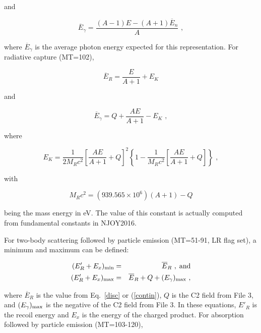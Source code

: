 \noindent
and

\begin{equation}
   \overline{E}_\gamma=
     \frac{(A-1)E-(A+1)\overline{E}_n}{A}\,\,,
\label{contin2}
\end{equation}
\vspace{0.5 pt}

\noindent
where $\overline{E}_\gamma$ is the average photon energy
expected for this representation.  For radiative capture (MT=102),

\begin{equation}
   \overline{E}_R=\frac{E}{A+1}+E_K
\end{equation}

\noindent
and

\begin{equation}
   \overline{E}_\gamma=Q+\frac{AE}{A+1}-E_K\,\,,
\end{equation}

\noindent
where

\begin{equation}
   E_K=\frac{1}{2M_Rc^2}\left[\frac{AE}{A+1}+Q\right]^2
     \left\{1-\frac{1}{M_Rc^2}\left[
       \frac{AE}{A+1}+Q\right]\right\}\,\,,
\end{equation}

\noindent
with

\noindent
\begin{equation}
   M_Rc^2=(939.565\times 10^6)(A+1)-Q
\end{equation}

\noindent
being the mass energy in eV.  The value of this constant is
actually computed from fundamental constants in NJOY2016.

For two-body scattering followed by particle emission
(MT=51-91, LR flag set), a minimum and maximum can be defined:

\begin{eqnarray}
   (E'_R+E_x)_{\rm min}&=&\overline{E}_R\,\,,\;\hbox{and}\\
   (E'_R+E_x)_{\rm max}&=&\overline{E}_R+Q+(E_\gamma)_{\rm max}\,\,,
\end{eqnarray}

\noindent
where $\overline{E}_R$ is the value from Eq.~\ref{disc} or
(\ref{contin}), $Q$ is the C2 field from File 3, and
$(E_\gamma)_{\rm max}$ is the negative of the C2 field from
File 3.  In these equations, $E'_R$ is the recoil energy
and $E_x$ is the energy of the charged product.  For
absorption followed by particle emission (MT=103-120),

